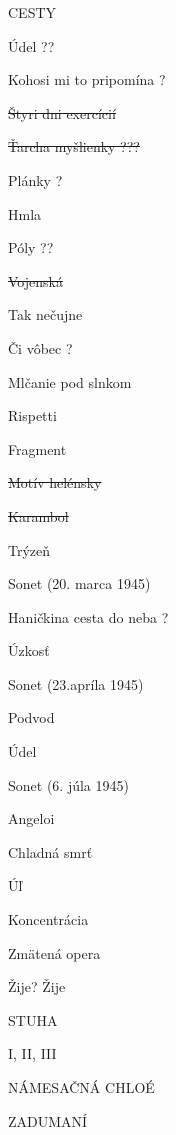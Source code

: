 \begin{paper}
\begin{figure}
\small
\begin{multicols}{2}
\begin{center}CESTY\end{center}

Údel ??

Kohosi mi to pripomína ?

\sout{Štyri dni exercícií}

\sout{Ťarcha myšlienky ???}

Plánky ?

Hmla

Póly ??

\sout{Vojenská}

Tak nečujne

Či vôbec ?

Mlčanie pod slnkom

Rispetti

Fragment

\sout{Motív helénsky}

\sout{Karambol}

Trýzeň

Sonet (20. marca 1945)

Haničkina cesta do neba ?

Úzkosť

Sonet (23.apríla 1945)

Podvod

Údel

Sonet (6. júla 1945)

Angeloi

Chladná smrť

Úľ

Koncentrácia

Zmätená opera

Žije? Žije

\vspace{1em}

\begin{center}STUHA\end{center}

I, II, III

\vspace{1em}

\begin{center}NÁMESAČNÁ CHLOÉ\end{center}

\newpage

\begin{center}ZADUMANÍ\end{center}


\end{multicols}
\end{figure}
\end{paper}
